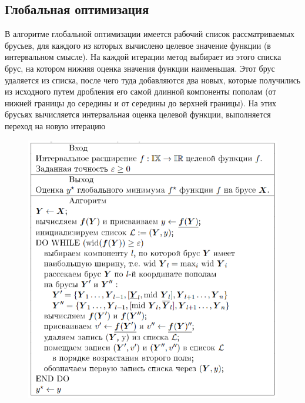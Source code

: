 \documentclass[12pt,a4paper]{article}
\begin{document}
        
            
            
            
        \subsection{Глобальная оптимизация}
            В алгоритме глобальной оптимизации имеется рабочий список рассматриваемых брусьев, для каждого из которых вычислено целевое значение функции (в интервальном смысле). На каждой итерации метод выбирает из этого списка брус, на котором нижняя оценка значения функции наименьшая. Этот брус удаляется из списка, после чего туда добавляются два новых, которые получились из исходного путем дробления его самой длинной компоненты пополам (от нижней границы до середины и от середины до верхней границы). На этих брусьях вычисляется интервальная оценка целевой функции, выполняется переход на новую итерацию
            
            \begin{figure}[H]
                \centering
                \includegraphics[width=13cm]{glob_opt_image.png}
                \label{fig:Himmel1}
            \end{figure}
            
            
              
\end{document}
